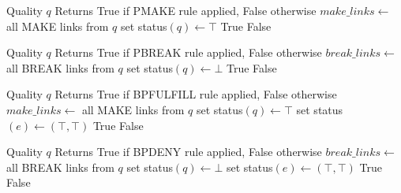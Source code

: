 \documentclass{article}
\begin{document}
\begin{algorithm}[H]
\caption{try\_pmake\_rule}
\begin{algorithmic}[1]
\REQUIRE Quality $q$
\ENSURE Returns True if PMAKE rule applied, False otherwise
\STATE $make\_links \gets$ all MAKE links from $q$
    \STATE set status$(q) \gets \top$
    \RETURN True
\ELSE
    \RETURN False
\ENDIF
\end{algorithmic}
\end{algorithm}

\begin{algorithm}[H]
\caption{try\_pbreak\_rule}
\begin{algorithmic}[1]
\REQUIRE Quality $q$
\ENSURE Returns True if PBREAK rule applied, False otherwise
\STATE $break\_links \gets$ all BREAK links from $q$
    \STATE set status$(q) \gets \bot$
    \RETURN True
\ELSE
    \RETURN False
\ENDIF
\end{algorithmic}
\end{algorithm}

\begin{algorithm}[H]
\caption{try\_bpfulfill\_rule}
\begin{algorithmic}[1]
\REQUIRE Quality $q$
\ENSURE Returns True if BPFULFILL rule applied, False otherwise
\STATE $make\_links \gets$ all MAKE links from $q$
    \STATE set status$(q) \gets \top$
                \STATE set status$(e) \gets (\top, \top)$
            \ENDIF
        \ENDFOR
    \ENDFOR
    \RETURN True
\ELSE
    \RETURN False
\ENDIF
\end{algorithmic}
\end{algorithm}

\begin{algorithm}[H]
\caption{try\_bpdeny\_rule}
\begin{algorithmic}[1]
\REQUIRE Quality $q$
\ENSURE Returns True if BPDENY rule applied, False otherwise
\STATE $break\_links \gets$ all BREAK links from $q$
    \STATE set status$(q) \gets \bot$
                \STATE set status$(e) \gets (\top, \top)$
            \ENDIF
        \ENDFOR
    \ENDFOR
    \RETURN True
\ELSE
    \RETURN False
\ENDIF
\end{algorithmic}
\end{algorithm}
\end{document}
